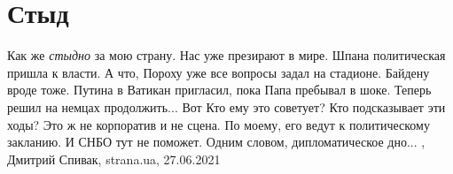  
 
 
 
 
\chapter{Стыд}

Как же \emph{стыдно} за мою страну. Нас уже презирают в мире. Шпана политическая
пришла к власти.  А что, Пороху уже все вопросы задал на стадионе. Байдену
вроде тоже. Путина в Ватикан пригласил, пока Папа пребывал в шоке. Теперь решил
на немцах продолжить...  Вот Кто ему это советует? Кто подсказывает эти ходы?
Это ж не корпоратив и не сцена. По моему, его ведут к политическому закланию. И
СНБО тут не поможет.  Одним словом, дипломатическое дно...
, 
Дмитрий Спивак, strana.ua, 27.06.2021
